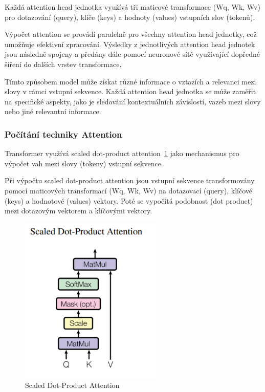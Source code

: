 Každá attention head jednotka využívá tři maticové transformace (Wq, Wk, Wv) pro dotazování (query), klíče (keys) a hodnoty (values) vstupních slov (tokenů).

Výpočet attention se provádí paralelně pro všechny attention head jednotky, což umožňuje efektivní zpracování.
Výsledky z jednotlivých attention head jednotek jsou následně spojeny a předány dále pomocí neuronové sítě využívající dopředné šíření do dalších vrstev transformace.

Tímto způsobem model může získat různé informace o vztazích a relevanci mezi slovy v rámci vstupní sekvence.
Každá attention head jednotka se může zaměřit na specifické aspekty, jako je sledování kontextuálních závislostí, vazeb mezi slovy nebo jiné relevantní informace.

\subsubsection{Počítání techniky Attention}
Transformer využívá scaled dot-product attention~\ref{fig:Scaled Dot-Product Attention} jako mechanismus pro výpočet vah mezi slovy (tokeny) vstupní sekvence.

Při výpočtu scaled dot-product attention jsou vstupní sekvence transformovány pomocí maticových transformací (Wq, Wk, Wv) na dotazovací (query), klíčové (keys) a hodnotové (values) vektory.
Poté se vypočítá podobnost (dot product) mezi dotazovým vektorem a klíčovými vektory.

\begin{figure}[H]
	\centering
	\includegraphics[width=0.6\textwidth]{Figures/scaled_product.png}
	\caption{Scaled Dot-Product Attention~\cite{link25}}\label{fig:Scaled Dot-Product Attention}
\end{figure}

